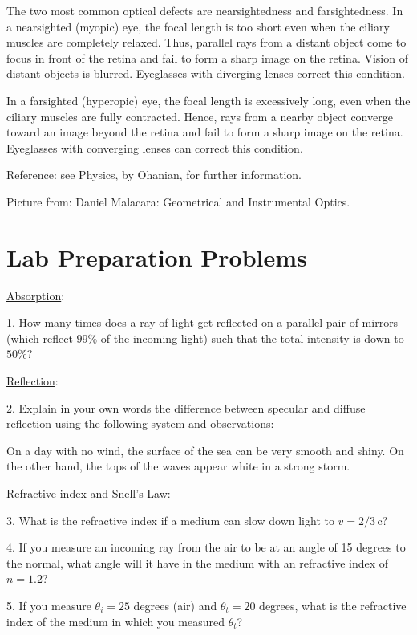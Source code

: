 The two most common optical defects are nearsightedness and farsightedness. In a nearsighted (myopic) eye, the focal length is too short even when the ciliary muscles are completely relaxed. Thus, parallel rays from a distant object come to focus in front of the retina and fail to form a sharp image on the retina. Vision of distant objects is blurred. Eyeglasses with diverging lenses correct this condition. \myskip

In a farsighted (hyperopic) eye, the focal length is excessively long, even when the ciliary muscles are fully contracted. Hence, rays from a nearby object converge toward an image beyond the retina and fail to form a sharp image on the retina. Eyeglasses with converging lenses can correct this condition.\myskip

Reference: see Physics, by Ohanian, for further information.\myskip

Picture from: Daniel Malacara: Geometrical and Instrumental Optics.

\section{Lab Preparation Problems}

\noindent \underline{Absorption}:\myskip

1. How many times does a ray of light get reflected on a parallel pair of mirrors (which reflect $99\%$ of the incoming light) such that the total intensity is down to $50\%$? \myskip

\noindent \underline{Reflection}: \myskip

2. Explain in your own words the difference between specular and diffuse reflection using the following system and observations: \myskip

On a day with no wind, the surface of the sea can be very smooth and shiny. On the other hand, the tops of the waves appear white in a strong storm. \myskip

\noindent \underline{Refractive index and Snell's Law}:\myskip

3. What is the refractive index if a medium can slow down light to $v = 2/3\,\mathrm{c}$? \myskip

4. If you measure an incoming ray from the air to be at an angle of 15 degrees to the normal, what angle will it have in the medium with an refractive index of $n = 1.2$? \myskip

5. If you measure $\theta_{i} = 25$ degrees (air) and $\theta_{t} = 20$ degrees, what is the refractive index of the medium in which you measured $\theta_{t}$?\myskip

